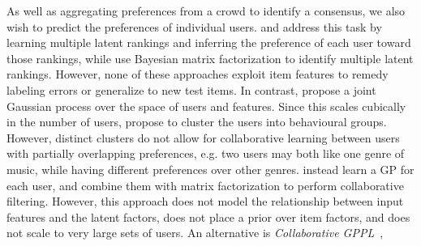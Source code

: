 As well as aggregating preferences from a crowd to identify a consensus,
we also wish to predict the preferences of individual users.
\citet{yi_inferring_2013} and \citet{kim2014latent} address this task by learning
 multiple latent rankings and inferring
the preference of each user toward those rankings, while 
\citet{salimans2012collaborative} use Bayesian matrix factorization to identify multiple
latent rankings.
However, none of these approaches exploit item features to remedy labeling errors or generalize to new test items.
In contrast, \citet{guo2010gaussian} propose a joint Gaussian process over the
space of users and features. Since this scales cubically
in the number of users, \citet{abbasnejad2013learning} 
propose to cluster the users into behavioural groups.
However, distinct clusters do not
allow for collaborative learning between users with partially overlapping preferences, e.g. two users may both like one genre of music, 
while having different preferences over other genres. 
\citet{khan2014scalable} instead learn a GP for each user,
and combine them with matrix factorization to perform collaborative filtering.
However, this approach does not model the relationship between
 input features and the latent factors, does not place a prior over item factors,
 and does not scale to very large sets of users.
An alternative is \emph{Collaborative GPPL}~\citep{houlsby2012collaborative},
